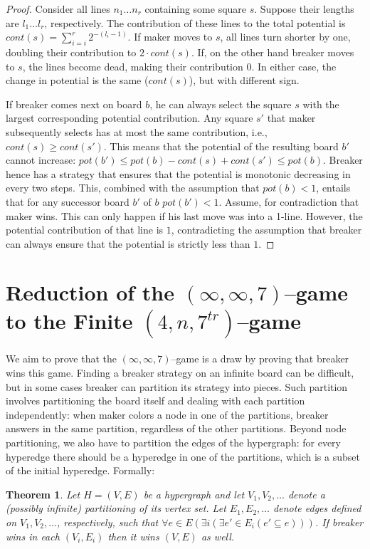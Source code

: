\documentclass[conference]{IEEEtran}
\newtheorem{theorem}{Theorem}[section]
\theoremstyle{definition}
\begin{document}
\begin{proof}
Consider all lines $n_1 \dots n_r$ containing some square $s$. Suppose their lengths are $l_1 \dots l_r$, respectively. The contribution of these lines to the total potential is $cont(s) = \sum_{i=i}^{r} 2^{-(l_i-1)}$. If maker moves to $s$, all lines turn shorter by one, doubling their contribution to $2\cdot cont(s)$. If, on the other hand breaker moves to $s$, the lines become dead, making their contribution $0$. In either case, the change in potential is the same ($cont(s)$), but with different sign. 

If breaker comes next on board $b$, he can always select the square $s$ with the largest corresponding potential contribution. Any square $s'$ that maker subsequently selects has at most the same contribution, i.e., $cont(s) \geq cont(s')$. This means that the potential of the resulting board $b'$ cannot increase: $pot(b') \leq pot(b) - cont(s) + cont(s') \leq pot(b)$. Breaker hence has a strategy that ensures that the potential is monotonic decreasing in every two steps. This, combined with the assumption that $pot(b) < 1$, entails that for any successor board $b'$ of $b$ $pot(b') < 1$. 
Assume, for contradiction that maker wins. This can only happen if his last move was into a 1-line. However, the potential contribution of that line is $1$, contradicting the assumption that breaker can always ensure that the potential is strictly less than $1$.
\end{proof}


\section{Reduction of the $(\infty,\infty,7)$--game to the Finite
  ${(4,n,7^{tr})}$--game}
\label{sec:reduction}

We aim to prove that the $(\infty,\infty,7)$--game is a draw by proving that breaker wins this game.
Finding a breaker strategy on an infinite board can be difficult, but in some cases breaker can partition its strategy into pieces. Such partition involves partitioning the board itself and dealing with each partition independently: when maker colors a node in one of the partitions, breaker answers in the same partition, regardless of the other partitions.
Beyond node partitioning, we also have to partition the edges of the hypergraph: for every hyperedge there should be a hyperedge in one of the partitions, which is a subset of the initial hyperedge. Formally: 

\begin{theorem}
\label{thm:reduction}
Let $H = (V, E)$ be a hypergraph and let $V_1, V_2, \dots$ denote a (possibly infinite) partitioning of its vertex set. Let $E_1, E_2, \dots$ denote edges defined on $V_1, V_2, \dots$, respectively, such that $\forall e \in E (\exists i (\exists e' \in E_i (e' \subseteq e)))$. If breaker wins in each $(V_i, E_i)$ then it wins $(V, E)$ as well.
\end{theorem}
\end{document}
